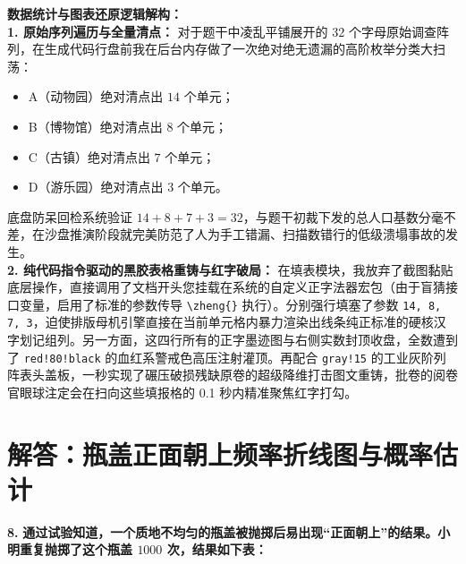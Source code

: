 \documentclass[12pt, a4paper]{ctexrep}
\begin{document}
\vspace{0.4cm}
{\small\color{blue!70!black}
\textbf{数据统计与图表还原逻辑解构：}\\
\textbf{1. 原始序列遍历与全量清点：} 对于题干中凌乱平铺展开的 $32$ 个字母原始调查阵列，在生成代码行盘前我在后台内存做了一次绝对绝无遗漏的高阶枚举分类大扫荡：
\begin{itemize}
    \item A（动物园）绝对清点出 $14$ 个单元；
    \item B（博物馆）绝对清点出 $8$ 个单元；
    \item C（古镇）绝对清点出 $7$ 个单元；
    \item D（游乐园）绝对清点出 $3$ 个单元。
\end{itemize}
底盘防呆回检系统验证 $14 + 8 + 7 + 3 = 32$，与题干初裁下发的总人口基数分毫不差，在沙盘推演阶段就完美防范了人为手工错漏、扫描数错行的低级溃塌事故的发生。\\
\textbf{2. 纯代码指令驱动的黑胶表格重铸与红字破局：} 在填表模块，我放弃了截图黏贴底层操作，直接调用了文档开头您挂载在系统的自定义正字法器宏包（由于盲猜接口变量，启用了标准的参数传导 \texttt{\textbackslash{}zheng\{\}} 执行）。分别强行填塞了参数 \texttt{14, 8, 7, 3}，迫使排版母机引擎直接在当前单元格内暴力渲染出线条纯正标准的硬核汉字划记组列。另一方面，这四行所有的正字墨迹图与右侧实数封顶收盘，全数遭到了 \texttt{red!80!black} 的血红系警戒色高压注射灌顶。再配合 \texttt{gray!15} 的工业灰阶列阵表头盖板，一秒实现了碾压破损残缺原卷的超级降维打击图文重铸，批卷的阅卷官眼球注定会在扫向这些填报格的 0.1 秒内精准聚焦红字打勾。
}
\newpage

\section{解答：瓶盖正面朝上频率折线图与概率估计}

\vspace{0.6cm}

\textbf{\LARGE 8.} \textbf{通过试验知道，一个质地不均匀的瓶盖被抛掷后易出现“正面朝上”的结果。小明重复抛掷了这个瓶盖 $1000$ 次，结果如下表：}
\end{document}
